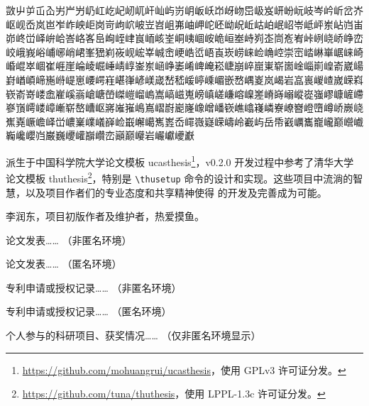 \documentclass[bachelor, comfort]{shtthesis}
\makeatletter
\def\ifundergraduate{\ifsht@undergraduate}
\makeatother
\begin{document}
{\fangsong 敳屮屰屲屳屴屵屶屷屸屹屺屻屼屽屾屿岃岄岅岆岇岈岉岊岋岌岍岎岏岐岑岒岓岔岕岖岘岙岚岜岝岞岟岠岗岢岣岤岥岦岧岨岪岫岬岮岯岰岲岴岵岶岷岹岺岻岼岽岾岿峀峁峂峃峄峅峆峇峈峉峊峋峌峍峎峏峐峑峒峓崓峖峗峘峚峙峛峜峝峞峟峠峢峣峤峥峦峧峨峩峪峬峫峭峮峯峱峲峳岘峵峷峸峹峺峼峾峿崀崁崂崃崄崅崆崇崈崉崊崋崌崃崎崏崐崒崓崔崕崖崘崚崛崜崝崞崟岽崡峥崣崤崥崦崧崨崩崪崫崬崭崮崯崰崱崲嵛崴崵崶崷崸崹崺崻崼崽崾崿嵀嵁嵂嵃嵄嵅嵆嵇嵈嵉嵊嵋嵌嵍嵎嵏岚嵑岩嵓嵔嵕嵖嵗嵘嵙嵚嵛嵜嵝嵞嵟嵠嵡嵢嵣嵤嵥嵦嵧嵨嵩嵪嵫嵬嵭嵮嵯嵰嵱嵲嵳嵴嵵嵶嵷嵸嵹嵺嵻嵼嵽嵾嵿嶀嵝嶂嶃崭嶅嶆岖嶈嶉嶊嶋嶌嶍嶎嶏嶐嶑嶒嶓嵚嶕嶖嶘嶙嶚嶛嶜嶝嶞嶟峤嶡峣嶣嶤嶥嶦峄峃嶩嶪嶫嶬嶭崄嶯嶰嶱嶲嶳岙嶵嶶嶷嵘嶹岭嶻屿岳帋巀巁巂巃巄巅巆巇巈巉巊岿巌巍巎巏巐巑峦巓巅巕岩巗巘巙巚}

\backmatter
\begin{acknowledgement}
\shtthesis 派生于中国科学院大学论文模板 \textsf{ucasthesis}\footnote{\url{https://github.com/mohuangrui/ucasthesis}，使用 GPLv3 许可证分发。}，v0.2.0 开发过程中参考了清华大学论文模板 \textsf{thuthesis}\footnote{\url{https://github.com/tuna/thuthesis}，使用 LPPL-1.3c 许可证分发。}，特别是 \verb|\thusetup| 命令的设计和实现。这些项目中流淌的智慧，以及项目作者们的专业态度和共享精神使得 \shtthesis 的开发及完善成为可能。
\end{acknowledgement}

\ifundergraduate
\else
\begin{resume}
  李润东，\shtthesis 项目初版作者及维护者，热爱摸鱼。
\end{resume}

\begin{publications}
  论文发表…… （非匿名环境）
\end{publications}

\begin{publications*}
  论文发表…… （匿名环境）
\end{publications*}

\begin{patterns}
  专利申请或授权记录…… （非匿名环境）
\end{patterns}

\begin{patterns*}
  专利申请或授权记录…… （匿名环境）
\end{patterns*}

\begin{projects}
  个人参与的科研项目、获奖情况…… （仅非匿名环境显示）
\end{projects}
\fi
\end{document}

